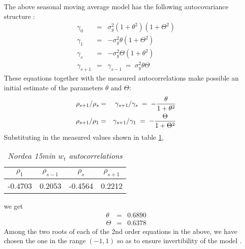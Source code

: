 The above seasonal moving average model has the following
autocovariance structure \cite{BoxJenkins94}:
\begin{eqnarray*}
  \gamma_0 &=& \sigma_y^2 (1 + \theta^2)(1 + \Theta^2) \\
  \gamma_1 &=& -\sigma_y^2\theta(1 + \Theta^2) \\
  \gamma_s &=& -\sigma_y^2\Theta(1 + \theta^2) \\
  \gamma_{s+1} &=& \gamma_{s-1}\;=\;\sigma_y^2\theta\Theta
\end{eqnarray*}
These equations together with the measured autocorrelations make
possible an initial estimate of the parameters $\theta$ and $\Theta$:
\begin{eqnarray*}
  {\rho_{s+1}/\rho_s} &=& {\gamma_{s+1}/\gamma_s} \;=\; -{\theta \over
    1 + \theta^2} \\
  {\rho_{s+1}/\rho_1} &=& {\gamma_{s+1}/\gamma_1} \;=\; -{\Theta \over
    1 + \Theta^2} \\
\end{eqnarray*}
Substituting in the measured values shown in table
\ref{tab:nordea_15min_w_acf},
\begin{table}[htb!]
  \centering
  \begin{tabular}{|c|c|c|c|}
    \hline
    $\rho_1$ & $\rho_{s-1}$ & $\rho_s$ & $\rho_{s+1}$ \\
    \hline
    -0.4703 &  0.2053 & -0.4564 &  0.2212 \\
    \hline
  \end{tabular}
  \caption{\small \it Nordea 15min $w_t$ autocorrelations}
  \label{tab:nordea_15min_w_acf}
\end{table}
we get
\begin{eqnarray*}
  \theta &=& 0.6890 \\
  \Theta &=& 0.6378
\end{eqnarray*}
Among the two roots of each of the 2nd order equations in the above,
we have chosen the one in the range $(-1, 1)$ so as to ensure
invertibility of the model \cite{BoxJenkins94}.

